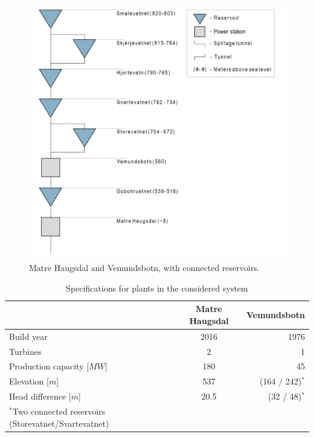 \begin{figure}[H]
    \centering
    \includegraphics[width=1\textwidth]{reservoir figure.png}
    \caption[Reservoir overview]{Matre Haugsdal and Vemundsbotn, with connected reservoirs.}
    \label{fig:reservoir_overview}
\end{figure}

\begin{table}[H]
    \caption{Specifications for plants in the considered system}
    \label{tab:plant_specifications}
\centering
    \begin{tabular}{ l  c  r }
        \toprule
        &  Matre Haugsdal & Vemundsbotn\\ \midrule
        Build year &  2016 &  1976\\ 
        Turbines & 2 & 1 \\ 
        Production capacity [$MW$] & 180 & 45 \\ 
        Elevation  [$m$] & 537 & (164 / 242)$^*$  \\ 
        Head difference [$m$] & 20.5 & (32 / 48)$^*$ \\ 
        \midrule
        \footnotesize$^*$Two connected reservoirs (Storevatnet/Svartevatnet)\\ \bottomrule

    \end{tabular}
\end{table}


